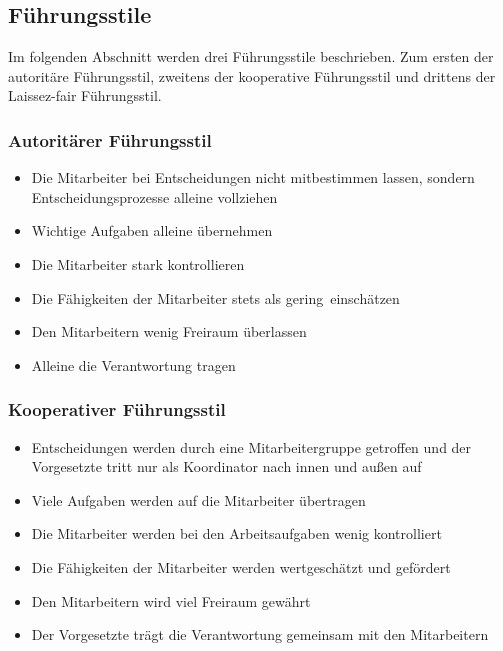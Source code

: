 \subsection{Führungsstile}

Im folgenden Abschnitt werden drei Führungsstile beschrieben. Zum ersten der autoritäre Führungsstil, zweitens der kooperative Führungsstil und drittens der Laissez-fair Führungsstil.

\subsubsection{Autoritärer Führungsstil}
\begin{itemize}
	\item Die Mitarbeiter bei Entscheidungen nicht mitbestimmen lassen, sondern Entscheidungsprozesse alleine vollziehen
	\item Wichtige Aufgaben alleine übernehmen
	\item Die Mitarbeiter stark kontrollieren
	\item Die Fähigkeiten der Mitarbeiter stets als \ql gering\qr\ einschätzen
	\item Den Mitarbeitern wenig Freiraum überlassen
	\item Alleine die Verantwortung tragen
\end{itemize}

\subsubsection{Kooperativer Führungsstil}
\begin{itemize}
	\item Entscheidungen werden durch eine Mitarbeitergruppe getroffen und der Vorgesetzte tritt nur als Koordinator nach innen und außen auf
	\item Viele Aufgaben werden auf die Mitarbeiter übertragen
	\item Die Mitarbeiter werden bei den Arbeitsaufgaben wenig kontrolliert
	\item Die Fähigkeiten der Mitarbeiter werden wertgeschätzt und gefördert
	\item Den Mitarbeitern wird viel Freiraum gewährt
	\item Der Vorgesetzte trägt die Verantwortung gemeinsam mit den Mitarbeitern
\end{itemize}

